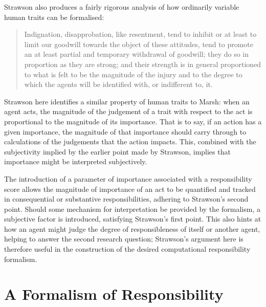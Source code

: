 Strawson also produces a fairly rigorous analysis of how ordinarily variable human traits can be formalised:

\begin{quotation}
    Indignation, disapprobation, like resentment, tend to inhibit or at least to limit our goodwill towards the object of these attitudes, tend to promote an at least partial and temporary withdrawal of goodwill; they do so in proportion as they are strong; and their strength is in general proportioned to what is felt to be the magnitude of the injury and to the degree to which the agents will be identified with, or indifferent to, it.\cite{strawson}
\end{quotation}

Strawson here identifies a similar property of human traits to Marsh: when an agent acts, the magnitude of the judgement of a trait with respect to the act is proportional to the magnitude of its importance. That is to say, if an action has a given importance, the magnitude of that importance should carry through to calculations of the judgements that the action impacts. This, combined with the subjectivity implied by the earlier point made by Strawson, implies that importance might be interpreted subjectively.\par

The introduction of a parameter of importance associated with a responsibility score allows the magnitude of importance of an act to be quantified and tracked in consequential or substantive responsibilities, adhering to Strawson's second point. Should some mechanism for interpretation be provided by the formalism, a subjective factor is introduced, satisfying Strawson's first point. This also hints at how an agent might judge the degree of responsibleness of itself or another agent, helping to answer the second research question; Strawson's argument here is therefore useful in the construction of the desired computational responsibility formalism.\par



\section{A Formalism of Responsibility}\label{sec:formalism_details}

